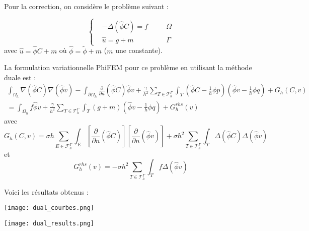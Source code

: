 Pour la correction, on considère le problème suivant :

\begin{equation*}
	\left\{\begin{aligned}
		&-\Delta (\hat{\phi}C)=f \quad &&\Omega \\
		&\hat{u}=g+m \quad &&\Gamma
	\end{aligned}\right. \label{pbc1r}
\end{equation*}
avec $\hat{u}=\hat{\phi}C+m$ où $\hat{\phi}=\tilde{\phi}+m$ ($m$ une constante).

La formulation variationnelle PhiFEM pour ce problème en utilisant la méthode duale est :
\begin{align*}
	\int_{\Omega_h}\nabla(\hat{\phi}C)\nabla(\hat{\phi}v)-\int_{\partial\Omega_h}\frac{\partial}{\partial n}(\hat{\phi}C)\hat{\phi}v + \frac{\gamma}{h^2} \sum_{T\in\mathcal{T}_h^\Gamma}\int_T \left(\hat{\phi} C-\frac{1}{h}\phi p\right)\left(\hat{\phi}v-\frac{1}{h}\phi q\right) + G_h(C,v)& \\
	= \int_{\Omega_h}f\hat{\phi}v + \frac{\gamma}{h^2} \sum_{T\in\mathcal{T}_h^\Gamma}\int_T (g+m)\left(\hat{\phi}v-\frac{1}{h}\phi q\right) + G_h^{rhs}(v)&
\end{align*}
avec
$$G_h(C,v)=\sigma h\sum_{E\in\mathcal{F}_h^\Gamma}\int_E\left[\frac{\partial}{\partial n}(\hat{\phi}C)\right]\left[\frac{\partial}{\partial n}(\hat{\phi}v)\right]+\sigma h^2\sum_{T\in\mathcal{T}_h^\Gamma}\int_T \Delta(\hat{\phi}C)\Delta(\hat{\phi}v)$$
et
$$G_h^{rhs}(v)=-\sigma h^2\sum_{T\in\mathcal{T}_h^\Gamma}\int_T f\Delta(\hat{\phi}v)$$

\newpage

Voici les résultats obtenus :

\begin{minipage}{0.38\linewidth}
	\centering
	\texttt{[image: dual\_courbes.png]}
\end{minipage}
\begin{minipage}{0.58\linewidth}
	\centering
	\texttt{[image: dual\_results.png]}
\end{minipage}
